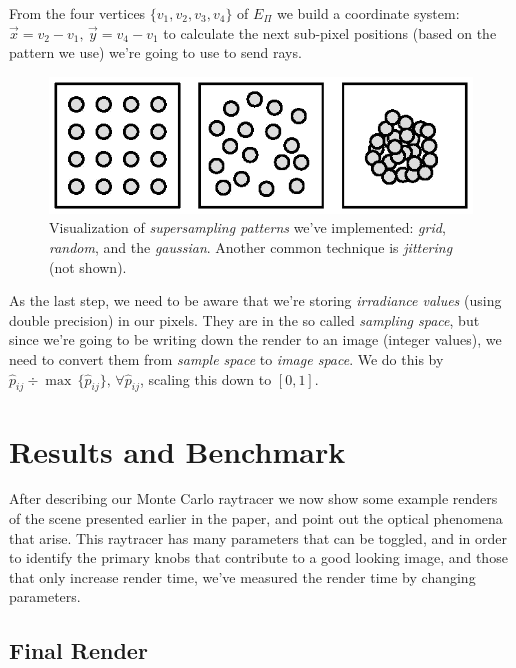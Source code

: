\documentclass[a4paper, twocolumn]{article}
\begin{document}
            From the four vertices \(\{v_1, v_2, v_3, v_4\}\) of \(E_\Pi\) we build a coordinate system: \(\vec{x} = v_2 - v_1,\, \vec{y} = v_4 - v_1\) to calculate the next sub-pixel positions (based on the pattern we use) we're going to use to send rays.

            \begin{figure}[ht]
                \centering
                \includegraphics[width=\linewidth]{share/sampling_methods.eps}
                \caption{Visualization of \emph{supersampling patterns} we've implemented: \emph{grid}, \emph{random}, and the \emph{gaussian}. Another common technique is \emph{jittering} (not shown).}
                \label{fig:sampling_methods}
            \end{figure}

            As the last step, we need to be aware that we're storing \emph{irradiance values} (using double precision) in our pixels. They are in the so called \emph{sampling space}, but since we're going to be writing down the render to an image (integer values), we need to convert them from \emph{sample space} to \emph{image space}. We do this by \(\hat{p}_{ij} \div \max\, \{\hat{p}_{ij}\},\, \forall \hat{p}_{ij}\), scaling this down to \([0,1]\).

    \section{Results and Benchmark} \label{sec:results_and_benchmark}

        After describing our Monte Carlo raytracer we now show some example renders of the scene presented earlier in the paper, and point out the optical phenomena that arise. This raytracer has many parameters that can be toggled, and in order to identify the primary knobs that contribute to a good looking image, and those that only increase render time, we've measured the render time by changing parameters.

        \subsection*{Final Render}
\end{document}
